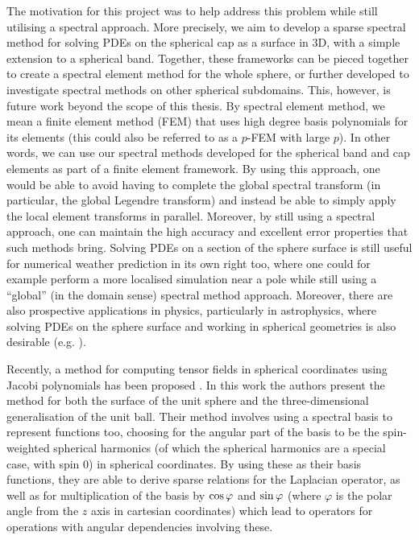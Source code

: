 The motivation for this project was to help address this problem while still utilising a spectral approach. More precisely, we aim to develop a sparse spectral method for solving PDEs on the spherical cap as a surface in 3D, with a simple extension to a spherical band. Together, these frameworks can be pieced together to create a spectral element method for the whole sphere, or further developed to investigate spectral methods on other spherical subdomains. This, however, is future work beyond the scope of this thesis. By spectral element method, we mean a finite element method (FEM) that uses high degree basis polynomials for its elements (this could also be referred to as a $p$-FEM with large $p$). In other words, we can use our spectral methods developed for the spherical band and cap elements as part of a finite element framework. By using this approach, one would be able to avoid having to complete the global spectral transform (in particular, the global Legendre transform) and instead be able to simply apply the local element transforms in parallel. Moreover, by still using a spectral approach, one can maintain the high accuracy and excellent error properties that such methods bring. Solving PDEs on a section of the sphere surface is still useful for numerical weather prediction in its own right too, where one could for example perform a more localised simulation near a pole while still using a \enquote{global} (in the domain sense) spectral method approach. Moreover, there are also prospective applications in physics, particularly in astrophysics, where solving PDEs on the sphere surface and working in spherical geometries is also desirable (e.g. \cite{vasil2019tensor, reinecke2013libsharp, beyer2014numerical, varshalovich1988quantum, slevinsky2018spectral, rubinstein2015scalar}).

Recently, a method for computing tensor fields in spherical coordinates using Jacobi polynomials has been proposed \cite{vasil2019tensor}. In this work the authors present the method for both the surface of the unit sphere and the three-dimensional generalisation of the unit ball. Their method involves using a spectral basis to represent functions too, choosing for the angular part of the basis to be the spin-weighted spherical harmonics (of which the spherical harmonics are a special case, with spin $0$) in spherical coordinates. By using these as their basis functions, they are able to derive sparse relations for the Laplacian operator, as well as for multiplication of the basis by $\cos\varphi$ and $\sin\varphi$ (where $\varphi$ is the polar angle from the $z$ axis in cartesian coordinates) which lead to operators for operations with angular dependencies involving these. 


